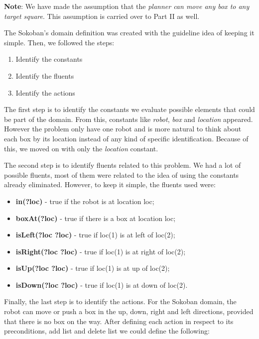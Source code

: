 \documentclass[10pt, letter]{article}
\begin{document}
\textbf{Note}: We have made the assumption that the \textit{planner can move any box to any target square}. This assumption is carried over to Part II as well.

The Sokoban's domain definition was created with the guideline idea of keeping it simple. Then, we followed the steps:

\begin{enumerate}
\item Identify the constants
\item Identify the fluents
\item Identify the actions
\end{enumerate} 

The first step is to identify the constants we evaluate possible elements that could be part of the domain. From this, constants like \textit{robot}, \textit{box} and \textit{location} appeared. However the problem only have one robot and is more natural to think about each box by its location instead of any kind of specific identification. Because of this, we moved on with only the \textit{location} constant.

The second step is to identify fluents related to this problem. We had a lot of possible fluents, most of them were related to the idea of using the constants already eliminated. However, to keep it simple, the fluents used were:

\begin{itemize}
\item \textbf{in(?loc)} - true if the robot is at location loc;
\item \textbf{boxAt(?loc)} - true if there is a box at location loc;
\item \textbf{isLeft(?loc ?loc)} - true if loc(1) is at left of loc(2);
\item \textbf{isRight(?loc ?loc)} - true if loc(1) is at right of loc(2);
\item \textbf{isUp(?loc ?loc)} - true if loc(1) is at up of loc(2);
\item \textbf{isDown(?loc ?loc)} - true if loc(1) is at down of loc(2).
\end{itemize} 

Finally, the last step is to identify the actions. For the Sokoban domain, the robot can move or push a box in the up, down, right and left directions, provided that there is no box on the way. After defining each action in respect to its preconditions, add list and delete list we could define the following:
\end{document}
